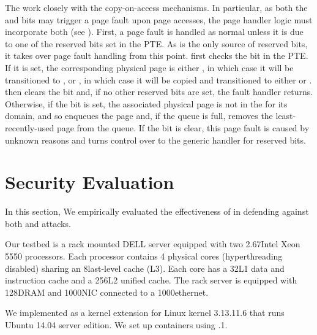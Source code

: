  The  work closely
with the copy-on-access mechanisms. In particular, as both the \COA
and \LRU bits may trigger a page fault upon page accesses, the page
handler logic must incorporate both (see ). First, a page
fault is handled as normal unless it is due to one of the reserved
bits set in the \gls{PTE}. As \cachebar is the only source of reserved bits,
it takes over page fault handling from this point. \cachebar first
checks the \COA bit in the \gls{PTE}. If it is set, the corresponding
physical page is either \shared, in which case it will be transitioned
to \accessed, or \accessed, in which case it will be copied and transitioned to either \shared or \exclusive.  \cachebar
then clears the \COA bit and, if no other reserved bits are set, the
fault handler returns.  Otherwise, if the \LRU bit is set, the
associated physical page is not in the \lru for its domain, and so
\cachebar enqueues the page and, if the queue is full, removes the
least-recently-used page from the queue.  If the \LRU bit is clear,
this page fault is caused by unknown reasons and \cachebar turns
control over to the generic handler for reserved bits.

\section{Security Evaluation}
\label{cachebar:sec:eval:security}
In this section, We empirically evaluated the effectiveness of \cachebar in
defending against both \flushreload and \primeprobe attacks.

Our testbed is a rack mounted DELL server equipped with two 2.67\gigahertz Intel Xeon
5550 processors. Each processor contains 4 physical cores (hyperthreading
disabled) sharing an 8\megabytes last-level cache (L3). Each core has a
32\kilobytes L1 data and instruction cache and a 256\kilobytes L2 unified cache.  The
rack server is equipped with 128\gigabytes DRAM and 1000\megabytes NIC connected to a
1000\megabytes ethernet.

We implemented \cachebar as a kernel extension for Linux kernel
3.13.11.6 that runs Ubuntu 14.04 server edition. We set up containers
using .1.
